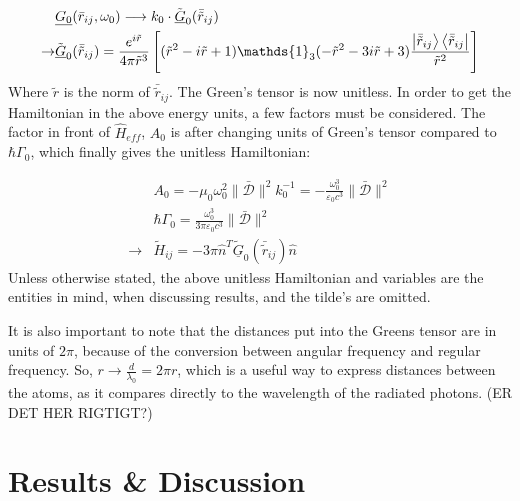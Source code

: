 \documentclass{article}
\begin{document}
\begin{equation}\label{eq:Green_unitless}
    \begin{split}
        &\underline{G_0}(\bar{r}_{ij}, \omega_0) \longrightarrow k_0 \cdot \tilde{\underline{G}}_0(\bar{\tilde{r}}_{ij}) \\
        \rightarrow &\tilde{\underline{G}}_0(\bar{\tilde{r}}_{ij}) = \frac{e^{i\tilde{r}}}{4\pi \tilde{r}^3} \left[ (\tilde{r}^2 - i\tilde{r} + 1) \mathds{1}_3 (-\tilde{r}^2 - 3i\tilde{r} + 3) \frac{\ket{\bar{\tilde{r}}_{ij}}\bra{\bar{\tilde{r}}_{ij}}}{\tilde{r}^2} \right]
    \end{split}
\end{equation}
Where $\tilde{r}$ is the norm of $\bar{\tilde{r}}_{ij}$. The Green's tensor is now unitless. In order to get the Hamiltonian in the above energy units, a few factors must be considered. The factor in front of $\hat{H}_{eff}$, $A_0$ is after changing units of Green's tensor compared to $\hbar \Gamma_0$, which finally gives the unitless Hamiltonian:

\begin{equation}\label{eq:Hamiltonian_unitless}
    \begin{split}
        &A_0 = -\mu_0 \omega_0^2 \| \bar{\mathscr{D}} \|^2 k_0^{-1} = - \frac{\omega_0^3}{\varepsilon_0 c^3} \| \bar{\mathscr{D}} \|^2 \\
        &\hbar \Gamma_0 = \frac{\omega_0^3}{3\pi \varepsilon_0 c^3} \| \bar{\mathscr{D}} \|^2 \\
        \longrightarrow & \tilde{H}_{ij} = -3 \pi \hat{n}^T \underline{\tilde{G}}_0 (\bar{\tilde{r}}_{ij}) \hat{n}
    \end{split}
\end{equation}
Unless otherwise stated, the above unitless Hamiltonian and variables are the entities in mind, when discussing results, and the tilde's are omitted. 

It is also important to note that the distances put into the Greens tensor are in units of $2\pi$, because of the conversion between angular frequency and regular frequency. So, $r \rightarrow \frac{d}{\lambda_0} = 2 \pi r$, which is a useful way to express distances between the atoms, as it compares directly to the wavelength of the radiated photons. (ER DET HER RIGTIGT?)

\section{Results \& Discussion}
\end{document}
